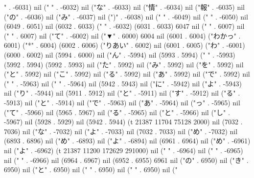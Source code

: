 " . -6031) nil (" " . -6032) nil ("な" . -6033) nil ("情" . -6034) nil ("報" . -6035) nil ("の" . -6036) nil ("み" . -6037) nil (")" . -6038) nil ("
" . -6049) nil (" " . -6050) nil (6049 . 6051) nil (6032 . 6033) (" " . -6032) (6031 . 6033) 6047 nil (" " . 6007) nil ("
" . 6007) nil ("て" . -6002) nil ("▼" . 6000) 6004 nil (6001 . 6004) ("わかっ" . 6001) ("*" . 6004) (6002 . 6006) ("りあい" . 6002) nil (6001 . 6005) ("わ" . -6001) (6000 . 6002) nil (5994 . 6000) nil ("ん" . -5994) nil (5993 . 5994) (" " . -5993) (5992 . 5994) (5992 . 5993) nil ("た" . 5992) nil ("み" . 5992) nil ("を" . 5992) nil ("と" . 5992) nil ("こ" . 5992) nil ("る" . 5992) nil ("あ" . 5992) nil ("で" . 5992) nil ("
" . -5963) nil (" " . -5964) nil (5942 . 5943) nil ("に" . -5942) nil ("よ" . -5943) nil ("り" . -5944) nil (5911 . 5912) nil ("と" . -5911) nil ("す" . -5912) nil ("る" . -5913) nil ("と" . -5914) nil ("で" . -5963) nil ("あ" . -5964) nil ("っ" . -5965) nil ("て" . -5966) nil (5965 . 5967) nil ("る" . -5965) nil ("と" . -5966) nil ("し" . -5967) nil (5928 . 5929) nil (5942 . 5944) (t 21387 11704 75128 2000) nil (7032 . 7036) nil ("な" . -7032) nil ("よ" . -7033) nil (7032 . 7033) nil ("め" . -7032) nil (6893 . 6896) nil ("め" . -6893) nil ("よ" . -6894) nil (6961 . 6964) nil ("め" . -6961) nil ("よ" . -6962) (t 21387 11200 172629 291000) nil ("
" . -6964) nil (" " . -6965) nil (" " . -6966) nil (6964 . 6967) nil (6952 . 6955) 6961 nil ("の" . 6950) nil ("き" . 6950) nil ("と" . 6950) nil (" " . 6950) nil (" " . 6950) nil ("
